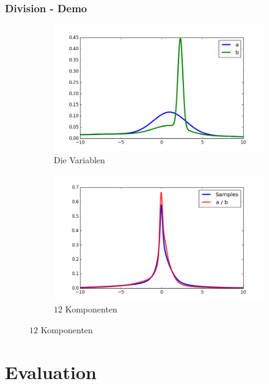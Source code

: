 \documentclass[11pt]{beamer}
\begin{document}
\begin{frame}
  \frametitle{Division - Demo}

  \begin{figure}
    \centering
    \begin{subfigure}[t]{0.45\textwidth}
      \centering
      \includegraphics[width=\textwidth]{thesis/operations/quotient-vars}
      \caption{Die Variablen}
    \end{subfigure}
    \hfill
    \begin{subfigure}[t]{0.45\textwidth}
      \centering
      \includegraphics[width=\textwidth]{thesis/operations/quotient-2-components}
      \caption{$12$ Komponenten}
    \end{subfigure}
  \end{figure}
\end{frame}

\section{Evaluation}
\end{document}
